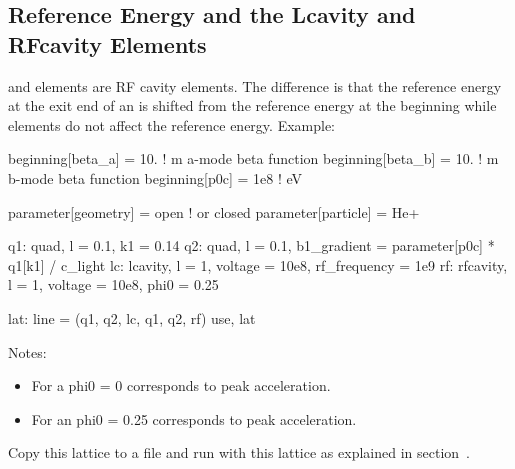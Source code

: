 \documentclass{hitec}
\begin{document}
\subsection{Reference Energy and the Lcavity and RFcavity Elements}


 and   elements are RF cavity elements. The difference is that the reference
 energy at the exit end of an  is shifted from the reference energy at the beginning
 while  elements do not affect the reference energy. Example:
{\small
\begin{code}
beginning[beta_a] = 10.   ! m  a-mode beta function
beginning[beta_b] = 10.   ! m  b-mode beta function
beginning[p0c] = 1e8   ! eV  

parameter[geometry] = open      ! or closed
parameter[particle] = He+ 

q1: quad, l = 0.1, k1 = 0.14
q2: quad, l = 0.1, b1_gradient = parameter[p0c] * q1[k1] / c_light
lc: lcavity, l = 1, voltage = 10e8, rf_frequency = 1e9
rf: rfcavity, l = 1, voltage = 10e8, phi0 = 0.25

lat: line = (q1, q2, lc, q1, q2, rf)
use, lat
\end{code}}

Notes:
\begin{itemize}
\item For a  phi0 = 0 corresponds to peak acceleration.
\item For an  phi0 = 0.25 corresponds to peak acceleration.
\end{itemize}

Copy this lattice to a file and run \tao with this lattice as explained in
section~.
\end{document}

